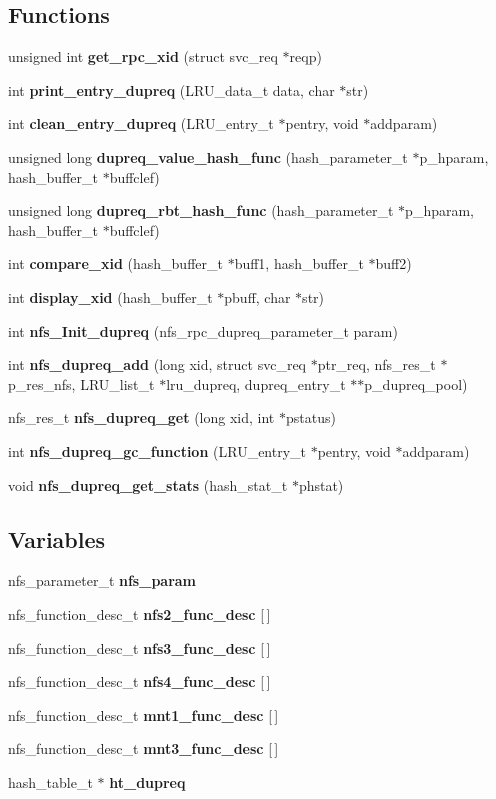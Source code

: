 \subsection*{Functions}
\begin{DoxyCompactItemize}
\item 
unsigned int {\bf get\_\-rpc\_\-xid} (struct svc\_\-req $\ast$reqp)
\item 
int {\bf print\_\-entry\_\-dupreq} (LRU\_\-data\_\-t data, char $\ast$str)
\item 
int {\bf clean\_\-entry\_\-dupreq} (LRU\_\-entry\_\-t $\ast$pentry, void $\ast$addparam)
\item 
unsigned long {\bf dupreq\_\-value\_\-hash\_\-func} (hash\_\-parameter\_\-t $\ast$p\_\-hparam, hash\_\-buffer\_\-t $\ast$buffclef)
\item 
unsigned long {\bf dupreq\_\-rbt\_\-hash\_\-func} (hash\_\-parameter\_\-t $\ast$p\_\-hparam, hash\_\-buffer\_\-t $\ast$buffclef)
\item 
int {\bf compare\_\-xid} (hash\_\-buffer\_\-t $\ast$buff1, hash\_\-buffer\_\-t $\ast$buff2)
\item 
int {\bf display\_\-xid} (hash\_\-buffer\_\-t $\ast$pbuff, char $\ast$str)
\item 
int {\bf nfs\_\-Init\_\-dupreq} (nfs\_\-rpc\_\-dupreq\_\-parameter\_\-t param)
\item 
int {\bf nfs\_\-dupreq\_\-add} (long xid, struct svc\_\-req $\ast$ptr\_\-req, nfs\_\-res\_\-t $\ast$p\_\-res\_\-nfs, LRU\_\-list\_\-t $\ast$lru\_\-dupreq, dupreq\_\-entry\_\-t $\ast$$\ast$p\_\-dupreq\_\-pool)
\item 
nfs\_\-res\_\-t {\bf nfs\_\-dupreq\_\-get} (long xid, int $\ast$pstatus)
\item 
int {\bf nfs\_\-dupreq\_\-gc\_\-function} (LRU\_\-entry\_\-t $\ast$pentry, void $\ast$addparam)
\item 
void {\bf nfs\_\-dupreq\_\-get\_\-stats} (hash\_\-stat\_\-t $\ast$phstat)
\end{DoxyCompactItemize}
\subsection*{Variables}
\begin{DoxyCompactItemize}
\item 
nfs\_\-parameter\_\-t {\bf nfs\_\-param}
\item 
nfs\_\-function\_\-desc\_\-t {\bf nfs2\_\-func\_\-desc} [$\,$]
\item 
nfs\_\-function\_\-desc\_\-t {\bf nfs3\_\-func\_\-desc} [$\,$]
\item 
nfs\_\-function\_\-desc\_\-t {\bf nfs4\_\-func\_\-desc} [$\,$]
\item 
nfs\_\-function\_\-desc\_\-t {\bf mnt1\_\-func\_\-desc} [$\,$]
\item 
nfs\_\-function\_\-desc\_\-t {\bf mnt3\_\-func\_\-desc} [$\,$]
\item 
hash\_\-table\_\-t $\ast$ {\bf ht\_\-dupreq}
\end{DoxyCompactItemize}


